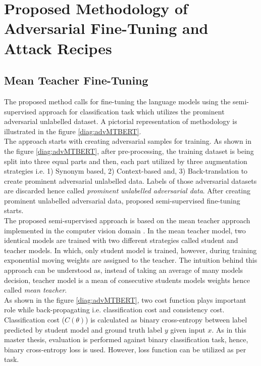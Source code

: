\documentclass[%
	BCOR=8mm, %
	DIV=12,
	toc=bibliography, %
	toc=listof, %
	oneside, %
	egregdoesnotlikesansseriftitles, %
	]{scrbook}
\begin{document}

\chapter{ Proposed Methodology of Adversarial Fine-Tuning and Attack Recipes}
\label{chapter:methodology}
\section{Mean Teacher Fine-Tuning}
\label{section:Meanteacher}
The proposed method calls for fine-tuning the language models using the semi-supervised approach for classification task which utilizes the prominent adversarial unlabelled dataset. A pictorial representation of methodology is illustrated in the figure \ref{diag:advMTBERT}.\\
The approach  starts with creating adversarial samples for training. As shown in the figure \ref{diag:advMTBERT}, after pre-processing, the training dataset is being split into three equal parts and then, each part utilized by three augmentation strategies  i.e. 1) Synonym based, 2) Context-based and, 3) Back-translation to create prominent adversarial unlabelled data.  Labels of those adversarial datasets are discarded hence called \textit{prominent unlabelled adversarial data}. After creating prominent unlabelled adversarial data, proposed semi-supervised fine-tuning starts.\\
The proposed semi-supervised approach is based on the mean teacher approach implemented in the computer vision domain \cite{tarvainen_mean_2018}. In the mean teacher model, two identical models are trained with two different strategies called student and teacher models. In which, only student model is trained, however, during training exponential moving weights are assigned to the teacher. The intuition behind this approach can be understood as, instead of taking an average of many models decision, teacher model is a mean of consecutive students models weights hence called \textit{mean teacher}. \\
As shown in the figure \ref{diag:advMTBERT}, two cost function plays important role while back-propagating i.e. classification cost and consistency cost. Classification cost ($C(\theta)$) is calculated as binary cross-entropy between label predicted by student model and ground truth label $y$ given input $x$.  As in this master thesis, evaluation is performed against binary classification task, hence, binary cross-entropy loss is used. However, loss function can be utilized as per task.\\ 
\end{document}
